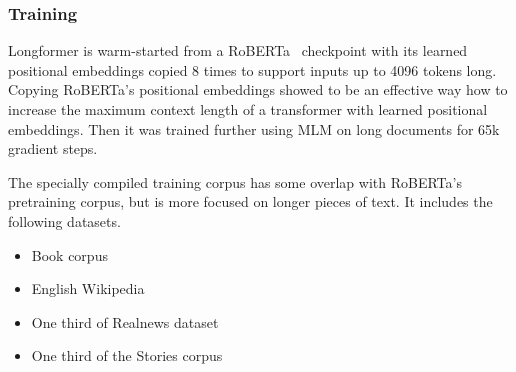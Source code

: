 \subsubsection{Training}

Longformer is warm-started from a RoBERTa~\citep{liu2019roberta} checkpoint with
its learned positional embeddings copied 8 times to support inputs up to 4096
tokens long. Copying RoBERTa's positional embeddings showed to be an effective
way how to increase the maximum context length of a transformer with learned
positional embeddings. Then it was trained further using MLM on long documents
for 65k gradient steps.

The specially compiled training corpus has some overlap with RoBERTa's
pretraining corpus, but is more focused on longer pieces of text. It includes
the following datasets.

\begin{itemize}
  \item Book corpus~\citep{zhu2015aligning}

  \item English Wikipedia

  \item One third of Realnews dataset~\citep{zellers2019defending}

  \item One third of the Stories corpus~\citep{trinh2018simple}

\end{itemize}
